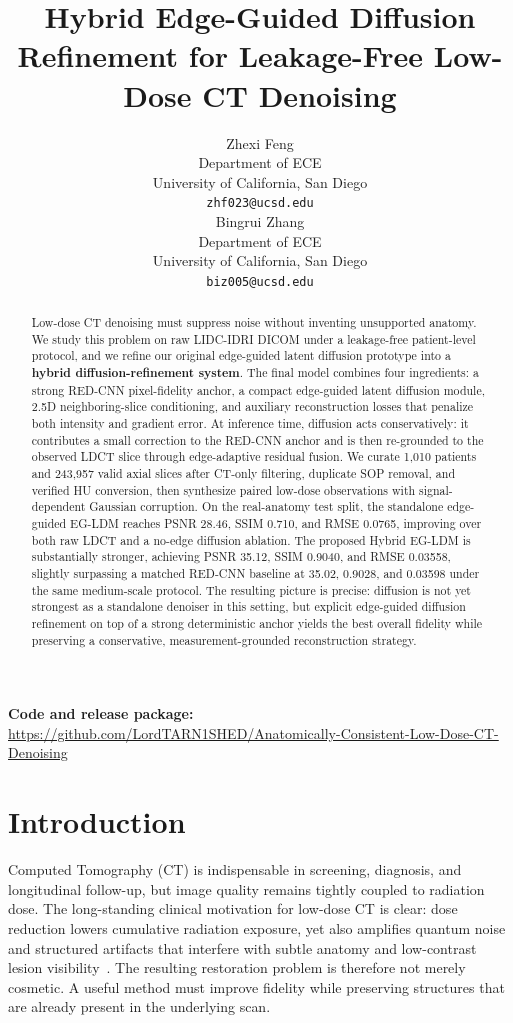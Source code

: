 \documentclass{article}
\title{Hybrid Edge-Guided Diffusion Refinement for Leakage-Free Low-Dose CT Denoising}
\author{%
  Zhexi Feng \\
  Department of ECE \\
  University of California, San Diego \\
  \texttt{zhf023@ucsd.edu} \\
  \And
  Bingrui Zhang \\
  Department of ECE \\
  University of California, San Diego \\
  \texttt{biz005@ucsd.edu} \\
}
\newcommand{\method}{EG-LDM}
\newcommand{\hybrid}{Hybrid EG-LDM}
\begin{document}
\maketitle

\begin{abstract}
Low-dose CT denoising must suppress noise without inventing unsupported anatomy. We study this problem on raw LIDC-IDRI DICOM under a leakage-free patient-level protocol, and we refine our original edge-guided latent diffusion prototype into a \textbf{hybrid diffusion-refinement system}. The final model combines four ingredients: a strong RED-CNN pixel-fidelity anchor, a compact edge-guided latent diffusion module, 2.5D neighboring-slice conditioning, and auxiliary reconstruction losses that penalize both intensity and gradient error. At inference time, diffusion acts conservatively: it contributes a small correction to the RED-CNN anchor and is then re-grounded to the observed LDCT slice through edge-adaptive residual fusion. We curate 1{,}010 patients and 243{,}957 valid axial slices after CT-only filtering, duplicate SOP removal, and verified HU conversion, then synthesize paired low-dose observations with signal-dependent Gaussian corruption. On the real-anatomy test split, the standalone edge-guided \method{} reaches PSNR 28.46, SSIM 0.710, and RMSE 0.0765, improving over both raw LDCT and a no-edge diffusion ablation. The proposed \hybrid{} is substantially stronger, achieving PSNR 35.12, SSIM 0.9040, and RMSE 0.03558, slightly surpassing a matched RED-CNN baseline at 35.02, 0.9028, and 0.03598 under the same medium-scale protocol. The resulting picture is precise: diffusion is not yet strongest as a standalone denoiser in this setting, but explicit edge-guided diffusion refinement on top of a strong deterministic anchor yields the best overall fidelity while preserving a conservative, measurement-grounded reconstruction strategy.
\end{abstract}

\noindent\textbf{Code and release package:} \url{https://github.com/LordTARN1SHED/Anatomically-Consistent-Low-Dose-CT-Denoising}

\section{Introduction}
Computed Tomography (CT) is indispensable in screening, diagnosis, and longitudinal follow-up, but image quality remains tightly coupled to radiation dose. The long-standing clinical motivation for low-dose CT is clear: dose reduction lowers cumulative radiation exposure, yet also amplifies quantum noise and structured artifacts that interfere with subtle anatomy and low-contrast lesion visibility~\cite{brenner2007}. The resulting restoration problem is therefore not merely cosmetic. A useful method must improve fidelity while preserving structures that are already present in the underlying scan.
\end{document}

